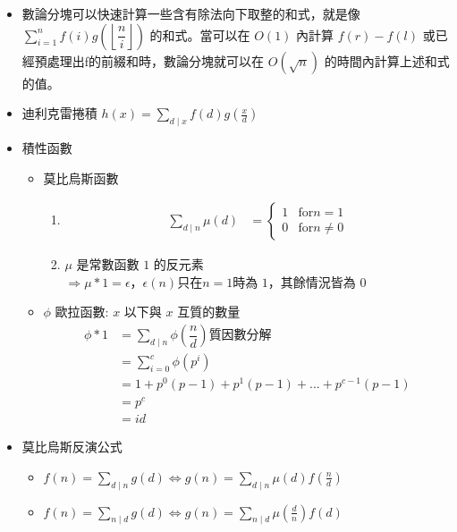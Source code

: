 \begin{itemize}
\item 數論分塊可以快速計算一些含有除法向下取整的和式，就是像 $\sum_{i = 1} ^ {n} f(i) g(\left\lfloor\dfrac ni\right\rfloor)$ 的和式。當可以在 $O(1)$ 內計算 $f(r) - f(l)$ 或已經預處理出f的前綴和時，數論分塊就可以在 $O(\sqrt n)$ 的時間內計算上述和式的值。
\item 迪利克雷捲積 $h(x) = \sum_{d \mid x} f(d) g(\frac{x}{d})$
\item 積性函數
    \begin{itemize}
        \item 莫比烏斯函數
            \begin{enumerate}
                \item 
                $$ \begin{aligned}
                    \sum_{d \mid n} \mu (d)
                    &=
                    \begin{cases}
                        1 & \text{for} n = 1\\
                        0 & \text{for} n \neq 0
                    \end{cases}
                \end{aligned} $$

                \item
                $\mu$ 是常數函數 $1$ 的反元素\\
                $\Rightarrow \mu \ast 1 = \epsilon$，$\epsilon (n) \text{只在} n = 1 \text{時為 1，其餘情況皆為 0}$
            \end{enumerate}

        \item $\phi$ 歐拉函數: $x$ 以下與 $x$ 互質的數量
        $$ \begin{aligned}
            \phi \ast 1
            &= \sum_{d \mid n} \phi(\dfrac {n}{d}) \text{質因數分解}\\
            &= \sum_{i = 0} ^ {c} \phi(p ^ i)\\
            &= 1 + p^0(p-1) + p^1(p-1) + ... + p^{c-1}(p-1)\\
            &= p^c\\
            &= id
        \end{aligned} $$
    \end{itemize}

\item 莫比烏斯反演公式
    \begin{itemize}
        \item $f(n)=\sum_{d\mid n}g(d)\Leftrightarrow g(n)=\sum_{d\mid n}\mu(d)f(\frac{n}{d})$
        \item $f(n)=\sum_{n\mid d}g(d)\Leftrightarrow g(n)=\sum_{n\mid d}\mu(\frac{d}{n})f(d)$
    \end{itemize}


\end{itemize}
